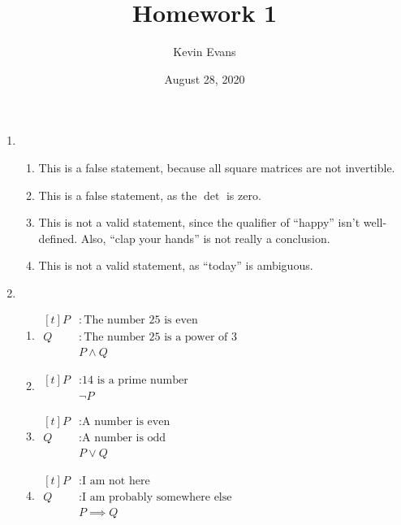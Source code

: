 \documentclass{homework}
\title{Homework 1}
\author{Kevin Evans}
\date{August 28, 2020}
\begin{document}
	\maketitle

	\begin{enumerate}
		\item \begin{enumerate}
			\item This is a false statement, because all square matrices are not invertible.
			\item This is a false statement, as the $\det$ is zero.
			\item This is not a valid statement, since the qualifier of ``happy'' isn't well-defined. Also, ``clap your hands'' is not really a conclusion.
			\item This is not a valid statement, as ``today'' is ambiguous. 
		\end{enumerate}
	
		\item \begin{enumerate}
			\item $\begin{aligned}[t]
				P & : \text{The number $25$ is even} \\
				Q & : \text{The number $25$ is a power of 3} \\
				& \boxed{P \wedge Q}
			\end{aligned}$
			
			\item $\begin{aligned}[t]
			P & : \text{14 is a prime number} \\
			& \boxed{\neg P}
			\end{aligned}$
			
			\item $\begin{aligned}[t]
			P & : \text{A number is even} \\
			Q & : \text{A number is odd} \\
			& \boxed{P \vee Q}
			\end{aligned}$
			
			\item $\begin{aligned}[t]
				P & : \text{I am not here} \\
				Q & : \text{I am probably somewhere else} \\
				& \boxed{P \implies Q}
			\end{aligned}$
		\end{enumerate}
	

\end{enumerate}
\end{document}
